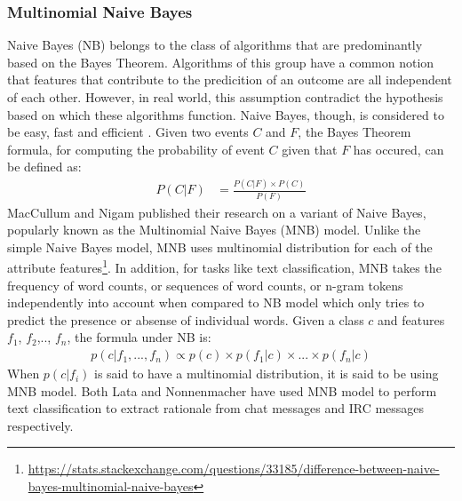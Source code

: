\documentclass[a4paper,12pt,twoside]{report}
\begin{document}
\subsubsection{Multinomial Naive Bayes}
Naive Bayes (NB) belongs to the class of algorithms that are predominantly based on the Bayes Theorem. Algorithms of this group have a common notion that features that contribute to the predicition of an outcome are all independent of each other. However, in real world, this assumption contradict the hypothesis based on which these algorithms function. Naive Bayes, though, is considered to be easy, fast and efficient \cite{Rennie2003}. 
\bigbreak
Given two events $C$ and $F$, the Bayes Theorem formula, for computing the probability of event $C$ given that $F$ has occured, can be defined as: 
\begin{align*}
P(C|F) &= \frac{P(C|F) \times P(C)}{P(F)}
\end{align*}
\bigbreak
MacCullum and Nigam \cite{McCallum1998a} published their research on a variant of Naive Bayes, popularly known as the Multinomial Naive Bayes (MNB) model. Unlike the simple Naive Bayes model, MNB uses multinomial distribution for each of the attribute features\footnote{\url{https://stats.stackexchange.com/questions/33185/difference-between-naive-bayes-multinomial-naive-bayes}}. In addition, for tasks like text classification, MNB takes the frequency of word counts, or sequences of word counts, or n-gram tokens independently into account when compared to NB model which only tries to predict the presence or absense of individual words. 
\bigbreak
Given a class $c$ and features $f_1$, $f_2$,.., $f_n$, the formula under NB is:
\begin{align*}
p(c|f_1,...,f_n) \propto p(c) \times p(f_1|c) \times ... \times p(f_n|c)
\end{align*}
\bigbreak
When $p(c|f_i)$ is said to have a multinomial distribution, it is said to be using MNB model.  
\bigbreak
Both Lata \cite{Lata2016} and Nonnenmacher\cite{Nonnenmacher2017} have used MNB model to perform text classification to extract rationale from chat messages and IRC messages respectively. 
\end{document}
